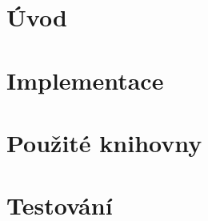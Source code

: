 \documentclass[12pt,a4paper,titlepage,final]{article}
\begin{document}



\pagestyle{plain}
\setcounter{page}{1}
\tableofcontents

\newpage
\pagestyle{plain}
\setcounter{page}{1}


\section{Úvod} \label{uvod}

\section{Implementace}

\section{Použité knihovny}

\section{Testování}

\end{document}
